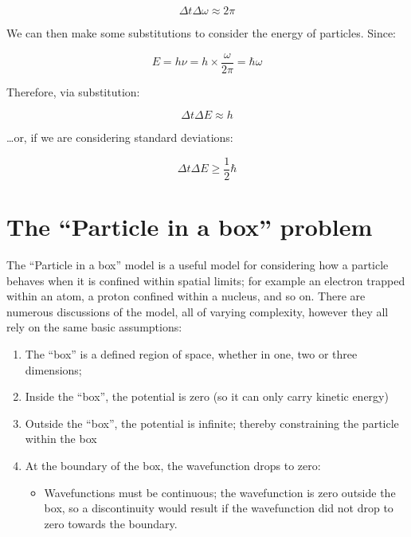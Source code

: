 \documentclass[
]{book}
\providecommand{\tightlist}{%
  \setlength{\itemsep}{0pt}\setlength{\parskip}{0pt}}
\begin{document}
\begin{equation}
\Delta t \Delta \omega \approx 2\pi
\end{equation}

We can then make some substitutions to consider the energy of particles. Since:

\begin{equation}
E = h\nu = h \times \frac{\omega}{2\pi} = \hbar \omega
\end{equation}

Therefore, via substitution:

\begin{equation}
\Delta t \Delta E \approx h
\end{equation}

\ldots or, if we are considering standard deviations:

\begin{equation}
 \Delta t \Delta E \geq \frac{1}{2}\hbar
\end{equation}

\hypertarget{sec:ch17-particlebox}{%
\section{The ``Particle in a box'' problem}\label{sec:ch17-particlebox}}

The ``Particle in a box'' model is a useful model for considering how a particle behaves when it is confined within spatial limits; for example an electron trapped within an atom, a proton confined within a nucleus, and so on. There are numerous discussions of the model, all of varying complexity, however they all rely on the same basic assumptions:

\begin{enumerate}
\def\labelenumi{\arabic{enumi}.}
\tightlist
\item
  The ``box'' is a defined region of space, whether in one, two or three dimensions;
\item
  Inside the ``box'', the potential is zero (so it can only carry kinetic energy)
\item
  Outside the ``box'', the potential is infinite; thereby constraining the particle within the box
\item
  At the boundary of the box, the wavefunction drops to zero:

  \begin{itemize}
  \tightlist
  \item
    Wavefunctions must be continuous; the wavefunction is zero outside the box, so a discontinuity would result if the wavefunction did not drop to zero towards the boundary.
  \end{itemize}
\end{enumerate}
\end{document}

